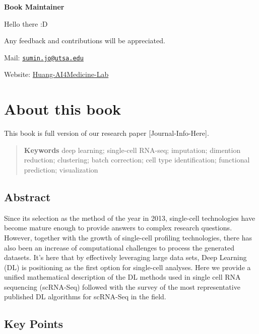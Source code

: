 \documentclass[
]{book}
\begin{document}
\textbf{Book Maintainer}

Hello there :D

Any feedback and contributions will be appreciated.

Mail: \href{mailto:sumin.jo@utsa.edu}{\nolinkurl{sumin.jo@utsa.edu}}

Website: \href{https://github.com/Huang-AI4Medicine-Lab}{Huang-AI4Medicine-Lab}

\hypertarget{about-this-book}{%
\chapter*{About this book}\label{about-this-book}}

This book is full version of our research paper {[}Journal-Info-Here{]}.

\begin{quote}
\textbf{Keywords}
deep learning; single-cell RNA-seq; imputation; dimention reduction; clustering; batch correction; cell type identification; functional prediction; visualization
\end{quote}

\hypertarget{abstract}{%
\section*{Abstract}\label{abstract}}

Since its selection as the method of the year in 2013, single-cell technologies have become mature enough to provide answers to complex research questions. However, together with the growth of single-cell profiling technologies, there has also been an increase of computational challenges to process the generated datasets. It's here that by effectively leveraging large data sets, Deep Learning (DL) is positioning as the first option for single-cell analyses. Here we provide a unified mathematical description of the DL methods used in single cell RNA sequencing (scRNA-Seq) followed with the survey of the most representative published DL algorithms for scRNA-Seq in the field.

\hypertarget{key-points}{%
\section*{Key Points}\label{key-points}}
\end{document}
